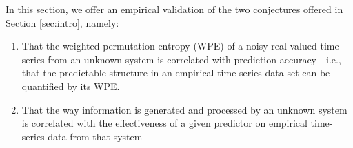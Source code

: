 


In this section, we offer an empirical validation of the two
conjectures offered in Section \ref{sec:intro}, namely:

\begin{enumerate}

\item That the weighted permutation entropy (WPE) of a noisy
  real-valued time series from an unknown system is correlated with
  prediction accuracy---i.e., that the predictable structure in an
  empirical time-series data set can be quantified by its WPE.



\item That the way information is generated and processed by an
  unknown system is correlated with the effectiveness of a given
  predictor on empirical time-series data from that system



\end{enumerate}


